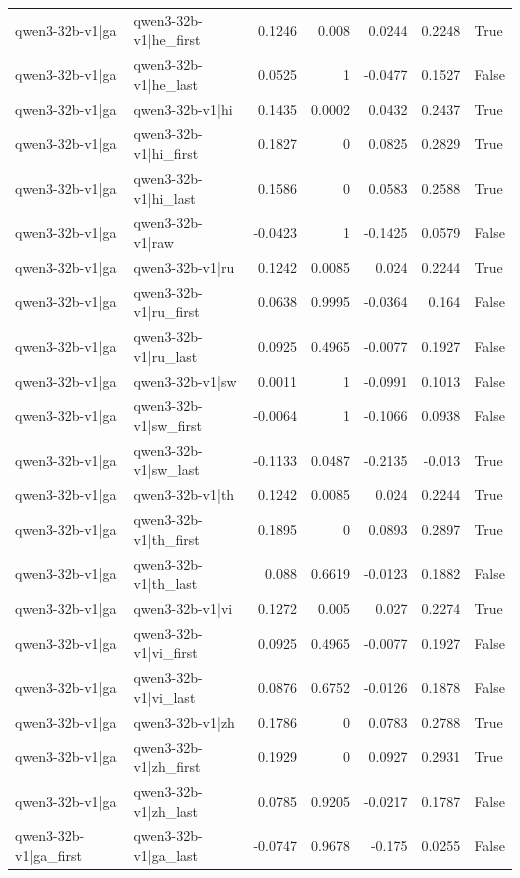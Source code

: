 \begin{table}
\begin{tabular}{l l r r r r l}
qwen3-32b-v1|ga & qwen3-32b-v1|he_first & 0.1246 & 0.008 & 0.0244 & 0.2248 & True \\
qwen3-32b-v1|ga & qwen3-32b-v1|he_last & 0.0525 & 1 & -0.0477 & 0.1527 & False \\
qwen3-32b-v1|ga & qwen3-32b-v1|hi & 0.1435 & 0.0002 & 0.0432 & 0.2437 & True \\
qwen3-32b-v1|ga & qwen3-32b-v1|hi_first & 0.1827 & 0 & 0.0825 & 0.2829 & True \\
qwen3-32b-v1|ga & qwen3-32b-v1|hi_last & 0.1586 & 0 & 0.0583 & 0.2588 & True \\
qwen3-32b-v1|ga & qwen3-32b-v1|raw & -0.0423 & 1 & -0.1425 & 0.0579 & False \\
qwen3-32b-v1|ga & qwen3-32b-v1|ru & 0.1242 & 0.0085 & 0.024 & 0.2244 & True \\
qwen3-32b-v1|ga & qwen3-32b-v1|ru_first & 0.0638 & 0.9995 & -0.0364 & 0.164 & False \\
qwen3-32b-v1|ga & qwen3-32b-v1|ru_last & 0.0925 & 0.4965 & -0.0077 & 0.1927 & False \\
qwen3-32b-v1|ga & qwen3-32b-v1|sw & 0.0011 & 1 & -0.0991 & 0.1013 & False \\
qwen3-32b-v1|ga & qwen3-32b-v1|sw_first & -0.0064 & 1 & -0.1066 & 0.0938 & False \\
qwen3-32b-v1|ga & qwen3-32b-v1|sw_last & -0.1133 & 0.0487 & -0.2135 & -0.013 & True \\
qwen3-32b-v1|ga & qwen3-32b-v1|th & 0.1242 & 0.0085 & 0.024 & 0.2244 & True \\
qwen3-32b-v1|ga & qwen3-32b-v1|th_first & 0.1895 & 0 & 0.0893 & 0.2897 & True \\
qwen3-32b-v1|ga & qwen3-32b-v1|th_last & 0.088 & 0.6619 & -0.0123 & 0.1882 & False \\
qwen3-32b-v1|ga & qwen3-32b-v1|vi & 0.1272 & 0.005 & 0.027 & 0.2274 & True \\
qwen3-32b-v1|ga & qwen3-32b-v1|vi_first & 0.0925 & 0.4965 & -0.0077 & 0.1927 & False \\
qwen3-32b-v1|ga & qwen3-32b-v1|vi_last & 0.0876 & 0.6752 & -0.0126 & 0.1878 & False \\
qwen3-32b-v1|ga & qwen3-32b-v1|zh & 0.1786 & 0 & 0.0783 & 0.2788 & True \\
qwen3-32b-v1|ga & qwen3-32b-v1|zh_first & 0.1929 & 0 & 0.0927 & 0.2931 & True \\
qwen3-32b-v1|ga & qwen3-32b-v1|zh_last & 0.0785 & 0.9205 & -0.0217 & 0.1787 & False \\
qwen3-32b-v1|ga_first & qwen3-32b-v1|ga_last & -0.0747 & 0.9678 & -0.175 & 0.0255 & False \\

\end{tabular}
\end{table}
